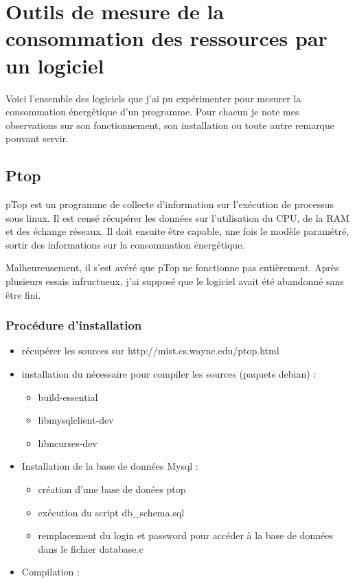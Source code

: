 \documentclass[a4paper, 11pt]{report}
\begin{document}
	\section{Outils de mesure de la consommation des ressources par un logiciel}
Voici l'ensemble des logiciels que j'ai pu expérimenter pour mesurer la consommation énergétique d'un programme. Pour chacun je note mes observations sur son fonctionnement, son installation ou toute autre remarque pouvant servir.
		\subsection{Ptop}
pTop est un programme de collecte d’information sur l'exécution de processus sous linux. Il est censé récupérer les données sur l'utilisation du CPU, de la RAM et des échange réseaux. Il doit ensuite être capable, une fois le modèle paramétré, sortir des informations sur la consommation énergétique.

Malheureusement, il s'est avéré que pTop ne fonctionne pas entièrement. Après plusieurs essais infructueux, j'ai supposé que le logiciel avait été abandonné sans être fini.

			\subsubsection{Procédure d'installation}
\begin{itemize}
    \item récupérer les sources sur http://mist.cs.wayne.edu/ptop.html
    \item installation du nécessaire pour compiler les sources (paquets debian) :
    \begin{itemize}
	\item build-essential
	\item libmysqlclient-dev
	\item libncurses-dev
    \end{itemize}
    \item Installation de la base de données Mysql :
    \begin{itemize}
	\item création d’une base de donées ptop
	\item exécution du script db\_schema.sql
	\item remplacement du login et password pour accéder à la base de données dans le fichier database.c
    \end{itemize}
    \item Compilation :
\end{itemize}
\end{document}
